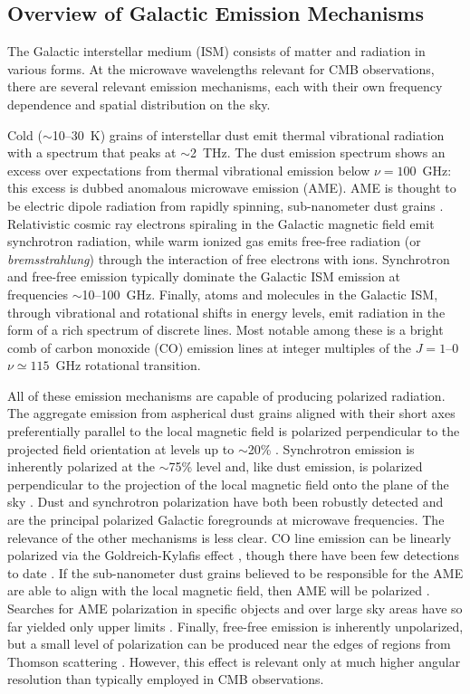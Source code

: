 \documentclass[twocolumn]{aastex631}
\begin{document}
\subsection{Overview of Galactic Emission Mechanisms} \label{sec:emission_mechanisms}
The Galactic interstellar medium (ISM) consists of matter and radiation in various forms. At the microwave wavelengths relevant for CMB observations, there are several relevant emission mechanisms, each with their own frequency dependence and spatial distribution on the sky.

Cold ($\sim$10--30~K) grains of interstellar dust emit thermal vibrational radiation with a spectrum that peaks at $\sim$2~THz. The dust emission spectrum shows an excess over expectations from thermal vibrational emission below $\nu=100$~GHz: this excess is dubbed anomalous microwave emission (AME). AME is thought to be electric dipole radiation from rapidly spinning, sub-nanometer dust grains \citep{Draine:1998}. Relativistic cosmic ray electrons spiraling in the Galactic magnetic field emit synchrotron radiation, while warm ionized gas emits free-free radiation (or \emph{bremsstrahlung}) through the interaction of free electrons with ions. Synchrotron and free-free emission typically dominate the Galactic ISM emission at frequencies $\sim$10--100~GHz. Finally, atoms and molecules in the Galactic ISM, through vibrational and rotational shifts in energy levels, emit radiation in the form of a rich spectrum of discrete lines. Most notable among these is a bright comb of carbon monoxide (CO) emission lines at integer multiples of the $J=1$--$0$ $\nu \simeq 115$~GHz rotational transition.

All of these emission mechanisms are capable of producing polarized radiation. The aggregate emission from aspherical dust grains aligned with their short axes preferentially parallel to the local magnetic field is polarized perpendicular to the projected field orientation at levels up to $\sim$20\% \citep{planck2014-XIX}. Synchrotron emission is inherently polarized at the $\sim$75\% level and, like dust emission, is polarized perpendicular to the projection of the local magnetic field onto the plane of the sky \citep{Rybicki:1986}. Dust and synchrotron polarization have both been robustly detected and are the principal polarized Galactic foregrounds at microwave frequencies. The relevance of the other mechanisms is less clear. CO line emission can be linearly polarized via the Goldreich-Kylafis effect \citep{Goldreich:1981}, though there have been few detections to date \citep[e.g.,][]{Greaves:1999, Greaves:2002, Cortes:2008, Houde:2013}. If the sub-nanometer dust grains believed to be responsible for the AME are able to align with the local magnetic field, then AME will be polarized \citep{Draine:1998b}. Searches for AME polarization in specific objects and over large sky areas have so far yielded only upper limits \citep[e.g.,][]{Genova-Santos:2017, Herman:2023}. Finally, free-free emission is inherently unpolarized, but a small level of polarization can be produced near the edges of  regions from Thomson scattering \citep{Rybicki:1986}. However, this effect is relevant only at much higher angular resolution than typically employed in CMB observations.
\end{document}
